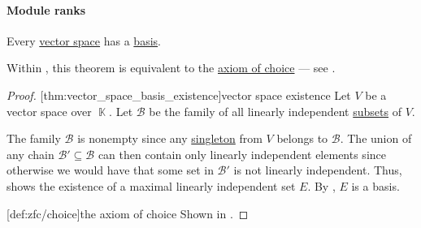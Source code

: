 \paragraph{Module ranks}

\begin{theorem}\label{thm:vector_space_basis_existence}
  Every \hyperref[def:vector_space]{vector space} has a \hyperref[def:hamel_basis]{basis}.
\end{theorem}
\begin{comments}
  \item Within \hyperref[def:zfc]{}, this theorem is equivalent to the \hyperref[def:zfc/choice]{axiom of choice} --- see .
\end{comments}
\begin{proof}
  [thm:vector_space_basis_existence]{vector space existence} Let \( V \) be a vector space over \( \BbbK \). Let \( \mathcal{B} \) be the family of all linearly independent \hyperref[def:linear_combination]{subsets} of \( V \).

  The family \( \mathcal{B} \) is nonempty since any \hyperref[def:subsingleton_set]{singleton} from \( V \) belongs to \( \mathcal{B} \). The union of any chain \( \mathcal{B}' \subseteq \mathcal{B} \) can then contain only linearly independent elements since otherwise we would have that some set in \( \mathcal{B}' \) is not linearly independent. Thus,  shows the existence of a maximal linearly independent set \( E \). By , \( E \) is a basis.

  [def:zfc/choice]{the axiom of choice} Shown in \cite{Blass1984BasesImplyAOC}.
\end{proof}

